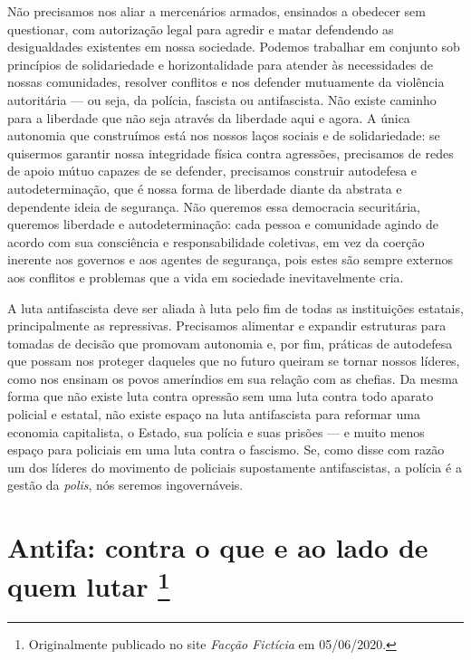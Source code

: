 Não precisamos nos aliar a mercenários armados, ensinados a obedecer sem questionar, com autorização legal para agredir e matar defendendo as desigualdades existentes em nossa sociedade. Podemos trabalhar em conjunto sob princípios de solidariedade e horizontalidade para atender às necessidades de nossas comunidades, resolver conflitos e nos defender mutuamente da violência autoritária --- ou seja, da polícia, fascista ou antifascista. Não existe caminho para a liberdade que não seja através da liberdade aqui e agora. A única autonomia que construímos está nos nossos laços sociais e de solidariedade: se quisermos garantir nossa integridade física contra agressões, precisamos de redes de apoio mútuo capazes de se defender, precisamos construir autodefesa e autodeterminação, que é nossa forma de liberdade diante da abstrata e dependente ideia de segurança. Não queremos essa democracia securitária, queremos liberdade e autodeterminação: cada pessoa e comunidade agindo de acordo com sua consciência e responsabilidade coletivas, em vez da coerção inerente aos governos e aos agentes de segurança, pois estes são sempre externos aos conflitos e problemas que a vida em sociedade inevitavelmente cria.

A luta antifascista deve ser aliada à luta pelo fim de todas as instituições estatais, principalmente as repressivas. Precisamos alimentar e expandir estruturas para tomadas de decisão que promovam autonomia e, por fim, práticas de autodefesa que possam nos proteger daqueles que no futuro queiram se tornar nossos líderes, como nos ensinam os povos ameríndios em sua relação com as chefias. Da mesma forma que não existe luta contra opressão sem uma luta contra todo aparato policial e estatal, não existe espaço na luta antifascista para reformar uma economia capitalista, o Estado, sua polícia e suas prisões --- e muito menos espaço para policiais em uma luta contra o fascismo. Se, como disse com razão um dos líderes do movimento de policiais supostamente antifascistas, a polícia é a gestão da \emph{polis}, nós seremos ingovernáveis.

\chapter*{Antifa: contra o que e ao lado de quem lutar \footnote[*]{Originalmente publicado no site \emph{Facção Fictícia} em 05/06/2020.}}

